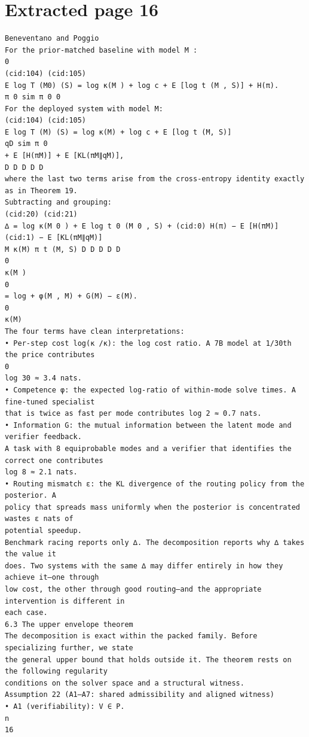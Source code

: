 \documentclass[11pt]{article}
\begin{document}
\section*{Extracted page 16}
\begin{verbatim}
Beneventano and Poggio
For the prior-matched baseline with model M :
0
(cid:104) (cid:105)
E log T (M0) (S) = log κ(M ) + log c + E [log t (M , S)] + H(π).
π 0 sim π 0 0
For the deployed system with model M:
(cid:104) (cid:105)
E log T (M) (S) = log κ(M) + log c + E [log t (M, S)]
qD sim π 0
+ E [H(πM)] + E [KL(πM∥qM)],
D D D D D
where the last two terms arise from the cross-entropy identity exactly as in Theorem 19.
Subtracting and grouping:
(cid:20) (cid:21)
∆ = log κ(M 0 ) + E log t 0 (M 0 , S) + (cid:0) H(π) − E [H(πM)] (cid:1) − E [KL(πM∥qM)]
M κ(M) π t (M, S) D D D D D
0
κ(M )
0
= log + φ(M , M) + G(M) − ε(M).
0
κ(M)
The four terms have clean interpretations:
• Per-step cost log(κ /κ): the log cost ratio. A 7B model at 1/30th the price contributes
0
log 30 ≈ 3.4 nats.
• Competence φ: the expected log-ratio of within-mode solve times. A fine-tuned specialist
that is twice as fast per mode contributes log 2 ≈ 0.7 nats.
• Information G: the mutual information between the latent mode and verifier feedback.
A task with 8 equiprobable modes and a verifier that identifies the correct one contributes
log 8 ≈ 2.1 nats.
• Routing mismatch ε: the KL divergence of the routing policy from the posterior. A
policy that spreads mass uniformly when the posterior is concentrated wastes ε nats of
potential speedup.
Benchmark racing reports only ∆. The decomposition reports why ∆ takes the value it
does. Two systems with the same ∆ may differ entirely in how they achieve it—one through
low cost, the other through good routing—and the appropriate intervention is different in
each case.
6.3 The upper envelope theorem
The decomposition is exact within the packed family. Before specializing further, we state
the general upper bound that holds outside it. The theorem rests on the following regularity
conditions on the solver space and a structural witness.
Assumption 22 (A1–A7: shared admissibility and aligned witness)
• A1 (verifiability): V ∈ P.
n
16
\end{verbatim}

\clearpage
\end{document}
